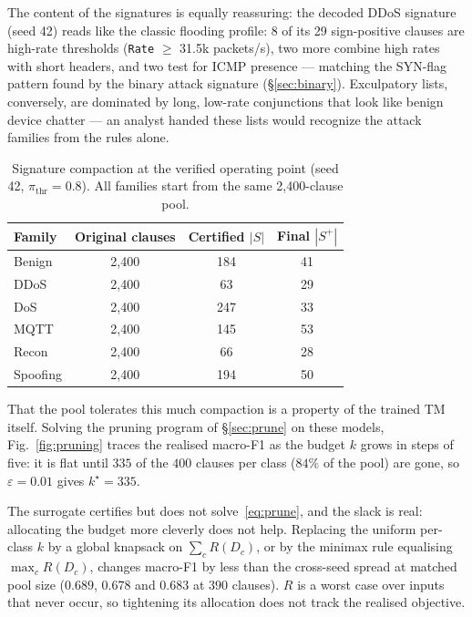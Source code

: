 \documentclass[conference]{IEEEtran}
\begin{document}
The content of the signatures is equally reassuring: the decoded DDoS
signature (seed 42) reads like the classic flooding profile: 8 of its 29
sign-positive clauses are high-rate thresholds (\texttt{Rate} $\ge$ 31.5k
packets/s), two more combine high rates with short headers, and two test
for ICMP presence --- matching the SYN-flag pattern found by the binary
attack signature (\S\ref{sec:binary}). Exculpatory lists, conversely, are
dominated by long, low-rate conjunctions that look like benign device
chatter --- an analyst handed these lists would recognize the attack
families from the rules alone.

\begin{table}[t]
\centering
\caption{Signature compaction at the verified operating point (seed 42,
$\pi_{\mathrm{thr}}{=}0.8$). All families start from the same
2{,}400-clause pool.}
\label{tab:reduction}
\small
\begin{tabular}{lccc}
\toprule
Family & Original clauses & Certified $|S|$ & Final $|S^{+}|$ \\
\midrule
Benign   & 2{,}400 & 184 & 41 \\
DDoS     & 2{,}400 &  63 & 29 \\
DoS      & 2{,}400 & 247 & 33 \\
MQTT     & 2{,}400 & 145 & 53 \\
Recon    & 2{,}400 &  66 & 28 \\
Spoofing & 2{,}400 & 194 & 50 \\
\bottomrule
\end{tabular}
\end{table}

That the pool tolerates this much compaction is a property of the trained
TM itself. Solving the pruning program of \S\ref{sec:prune} on these
models, Fig.~\ref{fig:pruning} traces the realised macro-F1 as the budget
$k$ grows in steps of five: it is flat until $335$ of the $400$ clauses
per class ($84\%$ of the pool) are gone, so $\varepsilon = 0.01$ gives
$k^{\star} = 335$.

The surrogate certifies but does not solve~\eqref{eq:prune}, and the slack
is real: allocating the budget more cleverly does not help. Replacing the
uniform per-class $k$ by a global knapsack on $\sum_c R(D_c)$, or by the
minimax rule equalising $\max_c R(D_c)$, changes macro-F1 by less than the
cross-seed spread at matched pool size ($0.689$, $0.678$ and $0.683$ at
$390$ clauses). $R$ is a worst case over inputs that never occur, so
tightening its allocation does not track the realised objective.
\end{document}
